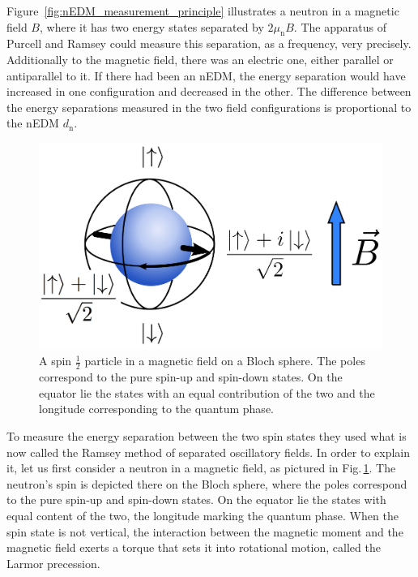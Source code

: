 Figure~\ref{fig:nEDM_measurement_principle} illustrates a neutron in a magnetic field $B$, where it has two energy states separated by $2 \mu_\text{n} B$. The apparatus of Purcell and Ramsey could measure this separation, as a frequency, very precisely. Additionally to the magnetic field, there was an electric one, either parallel or antiparallel to it. If there had been an nEDM, the energy separation would have increased in one configuration and decreased in the other. The difference between the energy separations measured in the two field configurations is proportional to the nEDM $d_\text{n}$.

\begin{figure}
  \centering
  \includegraphics[width=.6\linewidth]{gfx/nEDMatPSI/bloch_sphere.png}
  \caption{A spin $\tfrac{1}{2}$ particle in a magnetic field on a Bloch sphere. The poles correspond to the pure spin-up and spin-down states. On the equator lie the states with an equal contribution of the two and the longitude corresponding to the quantum phase.}
  \label{fig:nEDM_bloch_sphere}
\end{figure}

To measure the energy separation between the two spin states they used what is now called the Ramsey method of separated oscillatory fields. In order to explain it, let us first consider a neutron in a magnetic field, as pictured in Fig.\,\ref{fig:nEDM_bloch_sphere}. The neutron's spin is depicted there on the Bloch sphere, where the poles correspond to the pure spin-up and spin-down states. On the equator lie the states with equal content of the two, the longitude marking the quantum phase. When the spin state is not vertical, the interaction between the magnetic moment and the magnetic field exerts a torque that sets it into rotational motion, called the Larmor precession.

